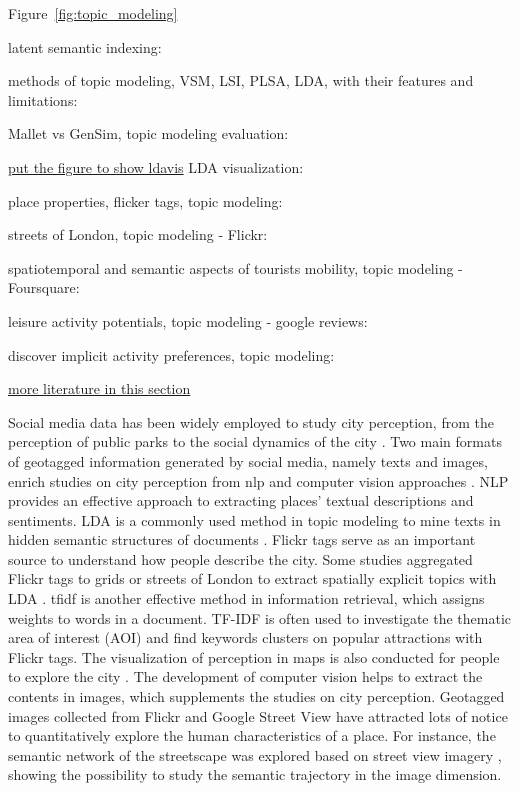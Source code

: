 \documentclass{article}
\begin{document}
Figure~\ref{fig:topic_modeling}

latent semantic indexing: \cite{papadimitriou_latent_2000}

methods of topic modeling, VSM, LSI, PLSA, LDA, with their features and limitations: \cite{barde_overview_2017}

Mallet vs GenSim, topic modeling evaluation: \cite{ebeid_mallet_2016}

\underline{put the figure to show ldavis}
LDA visualization: \cite{sievert_ldavis_2014}

place properties, flicker tags, topic modeling: \cite{bahrehdar_description_2018}

streets of London, topic modeling - Flickr: \cite{bahrehdar_streets_2020}

spatiotemporal and semantic aspects of tourists mobility, topic modeling - Foursquare: \cite{ferreira_uncovering_2020}

leisure activity potentials, topic modeling - google reviews: \cite{van_weerdenburg_where_2019}

discover implicit activity preferences, topic modeling: \cite{vu_discovering_2019}

\underline{more literature in this section}


Social media data has been widely employed to study city perception, from the perception of public parks \cite{huang_user_2022} to the social dynamics of the city \cite{cranshaw_livehoods_2021}. Two main formats of geotagged information generated by social media, namely texts and images, enrich studies on city perception from \acrfull{nlp} and computer vision approaches \cite{liu_mining_2020}. NLP provides an effective approach to extracting places' textual descriptions and sentiments. LDA is a commonly used method in topic modeling to mine texts in hidden semantic structures of documents \cite{papadimitriou_latent_2000}. Flickr tags serve as an important source to understand how people describe the city. Some studies aggregated Flickr tags to grids or streets of London to extract spatially explicit topics with LDA \cite{bahrehdar_description_2018}. \acrshort{tfidf} is another effective method in information retrieval, which assigns weights to words in a document. TF-IDF is often used to investigate the thematic area of interest (AOI) \cite{hu_extracting_2015} and find keywords clusters on popular attractions \cite{jailani_machine_2021} with Flickr tags. The visualization of perception in maps is also conducted for people to explore the city \cite{ahern_world_2007,dunkel_visualizing_2015}. The development of computer vision helps to extract the contents in images, which supplements the studies on city perception. Geotagged images collected from Flickr and Google Street View have attracted lots of notice to quantitatively explore the human characteristics of a place. For instance, the semantic network of the streetscape was explored based on street view imagery \cite{yap_incorporating_2022}, showing the possibility to study the semantic trajectory in the image dimension.
\end{document}
